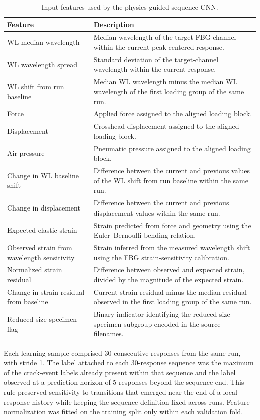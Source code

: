 \documentclass[notspecified,article,submit,pdftex,moreauthors]{Definitions/mdpi}
\begin{document}
\begin{table}[H]
\small
\caption{Input features used by the physics-guided sequence CNN.\label{tab:input_summary}}
\begin{tabularx}{\textwidth}{>{\raggedright\arraybackslash}p{}X}
\toprule
\textbf{Feature} & \textbf{Description} \\
\midrule
WL median wavelength & Median wavelength of the target FBG channel within the current peak-centered response. \\
WL wavelength spread & Standard deviation of the target-channel wavelength within the current response. \\
WL shift from run baseline & Median WL wavelength minus the median WL wavelength of the first loading group of the same run. \\
Force & Applied force assigned to the aligned loading block. \\
Displacement & Crosshead displacement assigned to the aligned loading block. \\
Air pressure & Pneumatic pressure assigned to the aligned loading block. \\
Change in WL baseline shift & Difference between the current and previous values of the WL shift from run baseline within the same run. \\
Change in displacement & Difference between the current and previous displacement values within the same run. \\
Expected elastic strain & Strain predicted from force and geometry using the Euler--Bernoulli bending relation. \\
Observed strain from wavelength sensitivity & Strain inferred from the measured wavelength shift using the FBG strain-sensitivity calibration. \\
Normalized strain residual & Difference between observed and expected strain, divided by the magnitude of the expected strain. \\
Change in strain residual from baseline & Current strain residual minus the median residual observed in the first loading group of the same run. \\
Reduced-size specimen flag & Binary indicator identifying the reduced-size specimen subgroup encoded in the source filenames. \\
\bottomrule
\end{tabularx}
\end{table}

Each learning sample comprised 30 consecutive responses from the same run, with stride 1. The label attached to each 30-response sequence was the maximum of the crack-event labels already present within that sequence and the label observed at a prediction horizon of 5 responses beyond the sequence end. This rule preserved sensitivity to transitions that emerged near the end of a local response history while keeping the sequence definition fixed across runs. Feature normalization was fitted on the training split only within each validation fold.
\end{document}
